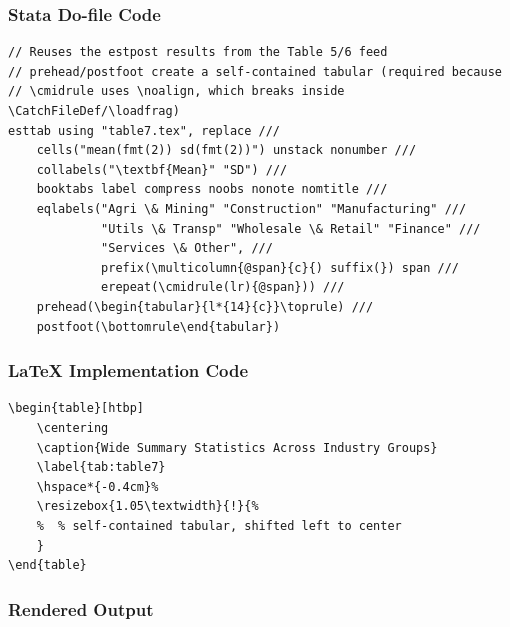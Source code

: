 \documentclass[11pt]{article}
\numberwithin{table}{section}
\newcommand{\loadfrag}[1]{%
	\begin{filecontents*}{#1}%
	\end{filecontents*}%
	\CatchFileDef{\mytable}{#1}{}%
}
\begin{document}
\subsubsection{Stata Do-file Code}
\begin{lstlisting}[style=stata]
// Reuses the estpost results from the Table 5/6 feed
// prehead/postfoot create a self-contained tabular (required because
// \cmidrule uses \noalign, which breaks inside \CatchFileDef/\loadfrag)
esttab using "table7.tex", replace ///
    cells("mean(fmt(2)) sd(fmt(2))") unstack nonumber ///
    collabels("\textbf{Mean}" "SD") ///
    booktabs label compress noobs nonote nomtitle ///
    eqlabels("Agri \& Mining" "Construction" "Manufacturing" ///
             "Utils \& Transp" "Wholesale \& Retail" "Finance" ///
             "Services \& Other", ///
             prefix(\multicolumn{@span}{c}{) suffix(}) span ///
             erepeat(\cmidrule(lr){@span})) ///
    prehead(\begin{tabular}{l*{14}{c}}\toprule) ///
    postfoot(\bottomrule\end{tabular})
\end{lstlisting}

\subsubsection{LaTeX Implementation Code}
\begin{lstlisting}[style=latex]
\begin{table}[htbp]
    \centering
    \caption{Wide Summary Statistics Across Industry Groups}
    \label{tab:table7}
    \hspace*{-0.4cm}%
    \resizebox{1.05\textwidth}{!}{%
    %  % self-contained tabular, shifted left to center
    }
\end{table}
\end{lstlisting}

\subsubsection{Rendered Output}
\begin{table}[htbp]
    \centering
    \caption{Wide Summary Statistics Across Industry Groups}
    \label{tab:table7_render}
    \hspace*{-0.4cm}%
    \resizebox{1.05\textwidth}{!}{%
    }
\end{table}
\end{document}

